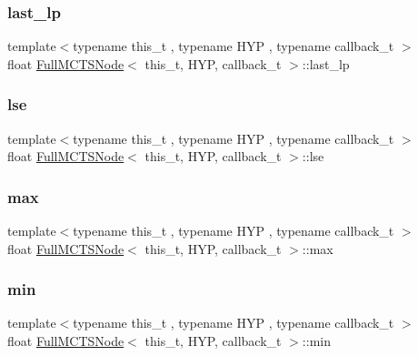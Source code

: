 \subsubsection{\texorpdfstring{last\+\_\+lp}{last\_lp}}
{\footnotesize\ttfamily template$<$typename this\+\_\+t , typename H\+YP , typename callback\+\_\+t $>$ \\
float \hyperlink{class_full_m_c_t_s_node}{Full\+M\+C\+T\+S\+Node}$<$ this\+\_\+t, H\+YP, callback\+\_\+t $>$\+::last\+\_\+lp}

\mbox{\label{class_full_m_c_t_s_node_a9bf1a9e08377dbf41965a94f1d36575a}} 
\subsubsection{\texorpdfstring{lse}{lse}}
{\footnotesize\ttfamily template$<$typename this\+\_\+t , typename H\+YP , typename callback\+\_\+t $>$ \\
float \hyperlink{class_full_m_c_t_s_node}{Full\+M\+C\+T\+S\+Node}$<$ this\+\_\+t, H\+YP, callback\+\_\+t $>$\+::lse}

\mbox{\label{class_full_m_c_t_s_node_ad3d15e6577534461b574f3f6305a1727}} 
\subsubsection{\texorpdfstring{max}{max}}
{\footnotesize\ttfamily template$<$typename this\+\_\+t , typename H\+YP , typename callback\+\_\+t $>$ \\
float \hyperlink{class_full_m_c_t_s_node}{Full\+M\+C\+T\+S\+Node}$<$ this\+\_\+t, H\+YP, callback\+\_\+t $>$\+::max}

\mbox{\label{class_full_m_c_t_s_node_a22e1cc7671e5ed2091ac4623e45f4723}} 
\subsubsection{\texorpdfstring{min}{min}}
{\footnotesize\ttfamily template$<$typename this\+\_\+t , typename H\+YP , typename callback\+\_\+t $>$ \\
float \hyperlink{class_full_m_c_t_s_node}{Full\+M\+C\+T\+S\+Node}$<$ this\+\_\+t, H\+YP, callback\+\_\+t $>$\+::min}

